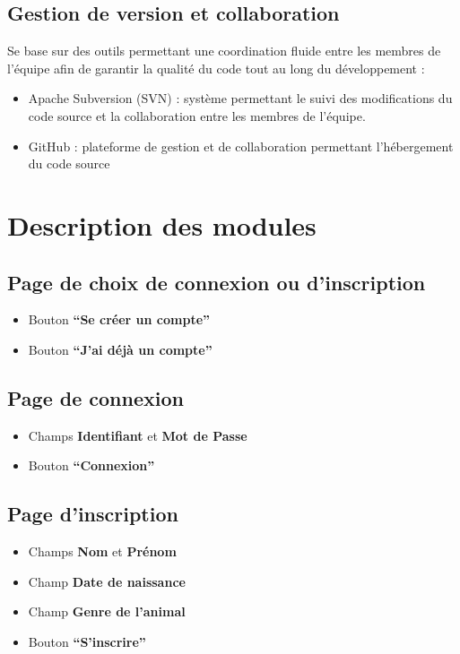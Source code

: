 \documentclass{conception_detaillee}
\begin{document}
\begin{itemize}[label=\textbullet]
\subsection{Gestion de version et collaboration}
Se base sur des
outils permettant une coordination fluide entre les
membres de l’équipe afin de garantir la qualité du code
tout au long du développement :
\begin{itemize}[label=\textbullet]
\item Apache Subversion (SVN) : système permettant le
suivi des modifications du code source et la
collaboration entre les membres de l’équipe.
\item GitHub : plateforme de gestion et de collaboration
permettant l’hébergement du code source
\end{itemize}
\section{Description des modules}
\subsection{Page de choix de connexion ou d'inscription}
\begin{itemize}
    \item Bouton \textbf{“Se créer un compte”}
    \item Bouton \textbf{“J’ai déjà un compte”}
\end{itemize}

\subsection{Page de connexion}
\begin{itemize}
    \item Champs \textbf{Identifiant} et \textbf{Mot de Passe}
    \item Bouton \textbf{“Connexion”}
\end{itemize}

\subsection{Page d’inscription}
\begin{itemize}
    \item Champs \textbf{Nom} et \textbf{Prénom}
    \item Champ \textbf{Date de naissance}
    \item Champ \textbf{Genre de l’animal}
    \item Bouton \textbf{“S'inscrire”}
\end{itemize}


\end{itemize}
\end{document}
